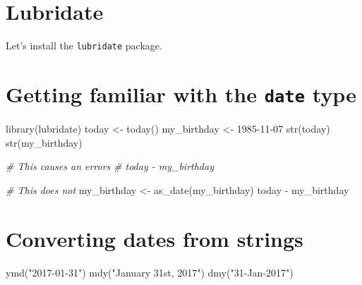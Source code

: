 \documentclass[
]{book}
\newenvironment{Shaded}{\begin{snugshade}}{\end{snugshade}}
\newcommand{\CommentTok}[1]{\textcolor[rgb]{0.56,0.35,0.01}{\textit{#1}}}
\newcommand{\FunctionTok}[1]{\textcolor[rgb]{0.00,0.00,0.00}{#1}}
\newcommand{\NormalTok}[1]{#1}
\newcommand{\OtherTok}[1]{\textcolor[rgb]{0.56,0.35,0.01}{#1}}
\newcommand{\SpecialCharTok}[1]{\textcolor[rgb]{0.00,0.00,0.00}{#1}}
\newcommand{\StringTok}[1]{\textcolor[rgb]{0.31,0.60,0.02}{#1}}
\begin{document}
\hypertarget{lubridate}{%
\section*{Lubridate}\label{lubridate}}

Let's install the \texttt{lubridate} package.

\hypertarget{getting-familiar-with-the-date-type}{%
\section*{\texorpdfstring{Getting familiar with the \texttt{date} type}{Getting familiar with the date type}}\label{getting-familiar-with-the-date-type}}

\begin{Shaded}
\begin{Highlighting}[]
\FunctionTok{library}\NormalTok{(lubridate)}
\NormalTok{today }\OtherTok{\textless{}{-}} \FunctionTok{today}\NormalTok{()}
\NormalTok{my\_birthday }\OtherTok{\textless{}{-}} \StringTok{\textquotesingle{}1985{-}11{-}07\textquotesingle{}}
\FunctionTok{str}\NormalTok{(today)}
\FunctionTok{str}\NormalTok{(my\_birthday)}

\CommentTok{\# This causes an errors}
\CommentTok{\# today {-} my\_birthday}

\CommentTok{\# This does not}
\NormalTok{my\_birthday }\OtherTok{\textless{}{-}} \FunctionTok{as\_date}\NormalTok{(my\_birthday)}
\NormalTok{today }\SpecialCharTok{{-}}\NormalTok{ my\_birthday}
\end{Highlighting}
\end{Shaded}

\hypertarget{converting-dates-from-strings}{%
\section*{Converting dates from strings}\label{converting-dates-from-strings}}

\begin{Shaded}
\begin{Highlighting}[]
\FunctionTok{ymd}\NormalTok{(}\StringTok{"2017{-}01{-}31"}\NormalTok{)}
\FunctionTok{mdy}\NormalTok{(}\StringTok{"January 31st, 2017"}\NormalTok{)}
\FunctionTok{dmy}\NormalTok{(}\StringTok{"31{-}Jan{-}2017"}\NormalTok{)}
\end{Highlighting}
\end{Shaded}
\end{document}

